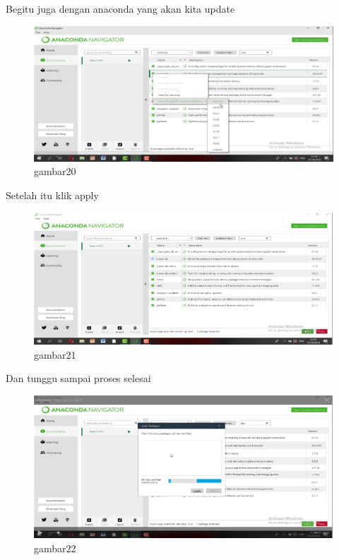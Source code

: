 Begitu juga dengan anaconda yang akan kita update
\begin{figure}[h]
\centering
    \includegraphics[scale=0.9]{section/54.png}
\caption{gambar20}
\label{fig:my_label}
\end{figure}

Setelah itu klik apply
\begin{figure}[h]
\centering
    \includegraphics[scale=0.9]{section/55.png}
\caption{gambar21}
\label{fig:my_label}
\end{figure}

Dan tunggu sampai proses selesai
\begin{figure}[h]
\centering
    \includegraphics[scale=0.9]{section/56.png}
\caption{gambar22}
\label{fig:my_label}
\end{figure}

